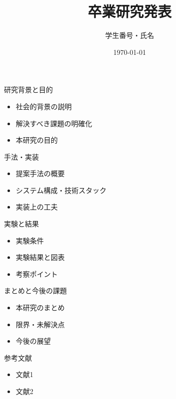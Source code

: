 \documentclass{beamer}
\title{卒業研究発表}
\author{学生番号・氏名}
\institute{南山大学 宮澤研究室}
\date{\today}
\begin{document}
\begin{frame}
  \titlepage
\end{frame}

\begin{frame}{研究背景と目的}
  \begin{itemize}
    \item 社会的背景の説明
    \item 解決すべき課題の明確化
    \item 本研究の目的
  \end{itemize}
\end{frame}

\begin{frame}{手法・実装}
  \begin{itemize}
    \item 提案手法の概要
    \item システム構成・技術スタック
    \item 実装上の工夫
  \end{itemize}
\end{frame}

\begin{frame}{実験と結果}
  \begin{itemize}
    \item 実験条件
    \item 実験結果と図表
    \item 考察ポイント
  \end{itemize}
\end{frame}

\begin{frame}{まとめと今後の課題}
  \begin{itemize}
    \item 本研究のまとめ
    \item 限界・未解決点
    \item 今後の展望
  \end{itemize}
\end{frame}

\begin{frame}{参考文献}
  \begin{itemize}
    \item 文献1
    \item 文献2
  \end{itemize}
\end{frame}
\end{document}
